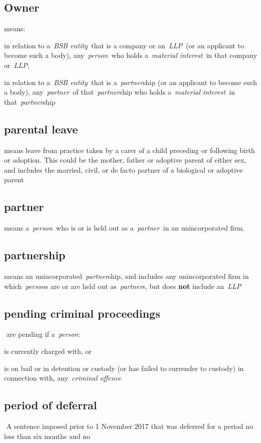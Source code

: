   \subsection{Owner } means: \al \item in relation to a~\emph{BSB entity~}that is
  a company or an~\emph{LLP~}(or an applicant to become such a body),
  any~\emph{person~}who holds a~\emph{material interest~}in that company
  or~\emph{LLP}; \item in relation to a~\emph{BSB entity~}that is
  a~\emph{partner}ship (or an applicant to become such a body),
  any~\emph{partner~}of that~\emph{partner}ship who holds
  a~\emph{material interest~}in that~\emph{partner}ship\la
    \subsection{parental leave } means leave from practice taken by a carer
  of a child preceding or following birth or adoption. This could be the
  mother, father or adoptive parent of either sex, and includes the
  married, civil, or de facto partner of a biological or adoptive
  parent  \subsection{partner } means a~\emph{person~}who is or is held out as
  a~\emph{partner~}in an unincorporated firm.  \subsection{partnership } means an unincorporated~\emph{partner}ship, and
  includes any unincorporated firm in which~\emph{person}s are or are
  held out as~\emph{partner}s, but does \textbf{not} include an~\emph{LLP} \subsection{pending criminal proceedings } are pending if
  a~\emph{person}:
  \al \item is currently charged with, or \item is on bail or in detention or custody (or has failed to surrender to custody) in connection with, any~\emph{criminal offence}\la\subsection{period of deferral } A sentence imposed prior to 1 November
  2017 that was deferred for a period no less than six months and no
